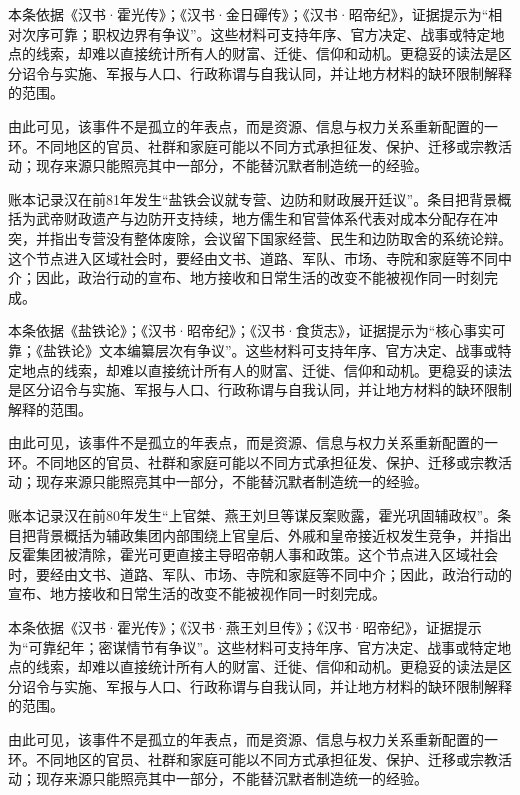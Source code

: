 本条依据《汉书·霍光传》；《汉书·金日磾传》；《汉书·昭帝纪》，证据提示为“相对次序可靠；职权边界有争议”。这些材料可支持年序、官方决定、战事或特定地点的线索，却难以直接统计所有人的财富、迁徙、信仰和动机。更稳妥的读法是区分诏令与实施、军报与人口、行政称谓与自我认同，并让地方材料的缺环限制解释的范围。

由此可见，该事件不是孤立的年表点，而是资源、信息与权力关系重新配置的一环。不同地区的官员、社群和家庭可能以不同方式承担征发、保护、迁移或宗教活动；现存来源只能照亮其中一部分，不能替沉默者制造统一的经验。

账本记录汉在前81年发生“盐铁会议就专营、边防和财政展开廷议”。条目把背景概括为武帝财政遗产与边防开支持续，地方儒生和官营体系代表对成本分配存在冲突，并指出专营没有整体废除，会议留下国家经营、民生和边防取舍的系统论辩。这个节点进入区域社会时，要经由文书、道路、军队、市场、寺院和家庭等不同中介；因此，政治行动的宣布、地方接收和日常生活的改变不能被视作同一时刻完成。

本条依据《盐铁论》；《汉书·昭帝纪》；《汉书·食货志》，证据提示为“核心事实可靠；《盐铁论》文本编纂层次有争议”。这些材料可支持年序、官方决定、战事或特定地点的线索，却难以直接统计所有人的财富、迁徙、信仰和动机。更稳妥的读法是区分诏令与实施、军报与人口、行政称谓与自我认同，并让地方材料的缺环限制解释的范围。

由此可见，该事件不是孤立的年表点，而是资源、信息与权力关系重新配置的一环。不同地区的官员、社群和家庭可能以不同方式承担征发、保护、迁移或宗教活动；现存来源只能照亮其中一部分，不能替沉默者制造统一的经验。

账本记录汉在前80年发生“上官桀、燕王刘旦等谋反案败露，霍光巩固辅政权”。条目把背景概括为辅政集团内部围绕上官皇后、外戚和皇帝接近权发生竞争，并指出反霍集团被清除，霍光可更直接主导昭帝朝人事和政策。这个节点进入区域社会时，要经由文书、道路、军队、市场、寺院和家庭等不同中介；因此，政治行动的宣布、地方接收和日常生活的改变不能被视作同一时刻完成。

本条依据《汉书·霍光传》；《汉书·燕王刘旦传》；《汉书·昭帝纪》，证据提示为“可靠纪年；密谋情节有争议”。这些材料可支持年序、官方决定、战事或特定地点的线索，却难以直接统计所有人的财富、迁徙、信仰和动机。更稳妥的读法是区分诏令与实施、军报与人口、行政称谓与自我认同，并让地方材料的缺环限制解释的范围。

由此可见，该事件不是孤立的年表点，而是资源、信息与权力关系重新配置的一环。不同地区的官员、社群和家庭可能以不同方式承担征发、保护、迁移或宗教活动；现存来源只能照亮其中一部分，不能替沉默者制造统一的经验。

